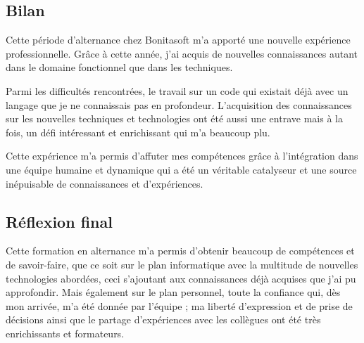 \subsection{Bilan}
Cette période d'alternance chez Bonitasoft m'a apporté une nouvelle expérience professionnelle. Grâce à cette année, j'ai acquis de nouvelles connaissances autant dans le domaine fonctionnel que dans les techniques.

Parmi les difficultés rencontrées, le travail sur un code qui existait déjà avec un langage que je ne connaissais pas en profondeur. L'acquisition des connaissances sur les nouvelles techniques et  technologies ont été aussi une entrave mais à la fois, un défi intéressant et enrichissant qui m'a beaucoup plu.

Cette expérience m'a permis d'affuter mes compétences grâce à l'intégration dans une équipe humaine et dynamique qui a été un véritable catalyseur et une source inépuisable de connaissances et d'expériences.


\subsection{Réflexion final}
Cette formation en alternance m'a permis d'obtenir beaucoup de compétences et de savoir-faire, que ce soit sur le plan informatique avec la multitude de nouvelles technologies abordées, ceci s'ajoutant aux connaissances déjà acquises que j'ai pu approfondir. Mais également sur le plan personnel, toute la confiance qui, dès mon arrivée, m'a été donnée par l'équipe ; ma liberté d'expression et de prise de décisions ainsi que le partage d'expériences avec les collègues ont été très enrichissants et formateurs.
